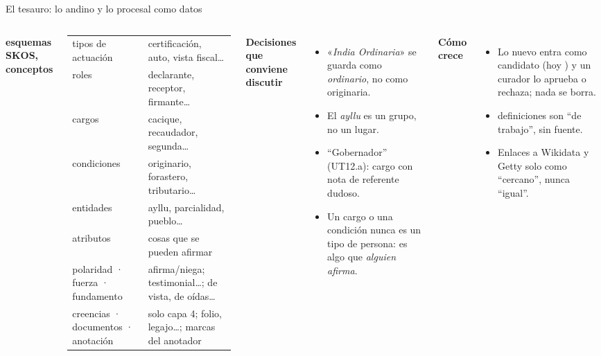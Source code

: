 \documentclass[aspectratio=169,10pt]{beamer}
\newcommand{\cita}[1]{«\textit{#1}»}
\begin{document}
\begin{frame}{El tesauro: lo andino y lo procesal como datos}
\begin{columns}[T]
\footnotesize
\textbf{\cifraEsquemas{} esquemas SKOS, \cifraConceptos{} conceptos}

\smallskip
\begin{tabular}{@{}L{2.6cm}L{3.5cm}@{}}
\toprule
tipos de actuación & certificación, auto, vista fiscal… \\
roles & declarante, receptor, firmante… \\
cargos & cacique, recaudador, segunda… \\
condiciones & originario, forastero, tributario… \\
entidades & ayllu, parcialidad, pueblo… \\
atributos & \cifraAtributos{} cosas que se pueden afirmar \\
polaridad · fuerza · fundamento & afirma/niega; testimonial…; de vista, de oídas… \\
creencias · documentos · anotación & solo capa 4; folio, legajo…; marcas del anotador \\
\bottomrule
\end{tabular}
\small
\textbf{Decisiones que conviene discutir}
\begin{itemize}\footnotesize
\item \cita{India Ordinaria} se guarda como \emph{ordinario}, \alert{no} como originaria.
\item El \emph{ayllu} es un grupo, no un lugar.
\item \enquote{Gobernador} (UT12.a): cargo con nota de referente dudoso.
\item Un cargo o una condición nunca es un tipo de persona: es algo que \emph{alguien afirma}.
\end{itemize}
\textbf{Cómo crece}
\begin{itemize}\footnotesize
\item Lo nuevo entra como \alert{candidato} (hoy \cifraCandidatos) y un curador lo aprueba o rechaza; nada se borra.
\item \cifraDefinicionesDeTrabajo{} definiciones son \enquote{de trabajo}, sin fuente.
\item Enlaces a Wikidata y Getty solo como \enquote{cercano}, nunca \enquote{igual}.
\end{itemize}
\end{columns}
\end{frame}
\end{document}
